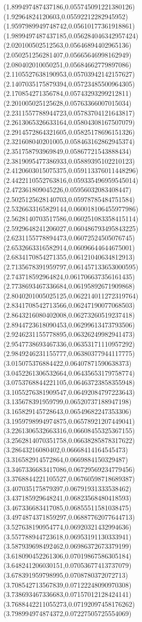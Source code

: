 {(1.899497487437186,0.055745091221380126)
(1.92964824120603,0.05592212282945952)
(1.9597989949748742,0.05610177361918861)
(1.9899497487437185,0.056284046342957424)
(2.020100502512563,0.05646894402965136)
(2.050251256281407,0.05665646998162949)
(2.080402010050251,0.05684662779897086)
(2.1105527638190953,0.05703942142157627)
(2.1407035175879394,0.05723485500964305)
(2.170854271356784,0.05743293299212811)
(2.201005025125628,0.05763366007015034)
(2.2311557788944723,0.05783704121643817)
(2.2613065326633164,0.05804308167507079)
(2.2914572864321605,0.05825178696151326)
(2.321608040201005,0.058463162862945374)
(2.351758793969849,0.05867721543888434)
(2.3819095477386933,0.05889395102210123)
(2.4120603015075375,0.059113376011448296)
(2.4422110552763816,0.059335496959545014)
(2.472361809045226,0.05956032083408447)
(2.5025125628140703,0.05978785484751584)
(2.5326633165829144,0.060018106455977986)
(2.5628140703517586,0.060251083358415114)
(2.5929648241206027,0.060486793495843225)
(2.6231155778894473,0.06072524505076745)
(2.6532663316582914,0.06096644644675001)
(2.6834170854271355,0.06121040634812913)
(2.7135678391959797,0.061457133653000595)
(2.743718592964824,0.061706637356161435)
(2.7738693467336684,0.06195892671909868)
(2.8040201005025125,0.062214011272319764)
(2.8341708542713566,0.06247190077068503)
(2.8643216080402008,0.06273260519237418)
(2.8944723618090453,0.06299613473793506)
(2.9246231155778895,0.06326249982941473)
(2.9547738693467336,0.06353171110957292)
(2.9849246231155777,0.06380377944117775)
(3.015075376884422,0.06407871590638373)
(3.0452261306532664,0.06435653179758774)
(3.0753768844221105,0.06463723858355948)
(3.1055276381909547,0.06492084797223643)
(3.135678391959799,0.06520737188947198)
(3.165829145728643,0.06549682247353306)
(3.1959798994974875,0.06578921207449041)
(3.2261306532663316,0.06608455325367155)
(3.2562814070351758,0.06638285878317622)
(3.28643216080402,0.06668414164545473)
(3.316582914572864,0.0669884150329487)
(3.3467336683417086,0.06729569234779456)
(3.3768844221105527,0.06760598718689387)
(3.407035175879397,0.06791931333538462)
(3.437185929648241,0.06823568480418593)
(3.467336683417085,0.06855511581038475)
(3.4974874371859297,0.06887762077644713)
(3.527638190954774,0.06920321432994636)
(3.557788944723618,0.06953191130333941)
(3.587939698492462,0.06986372673379199)
(3.618090452261306,0.07019867586305184)
(3.648241206030151,0.07053677413737079)
(3.678391959798995,0.0708780372072713)
(3.708542713567839,0.07122248090970308)
(3.738693467336683,0.07157012128424141)
(3.7688442211055273,0.07192097458176262)
(3.798994974874372,0.07227505725554069)
}
